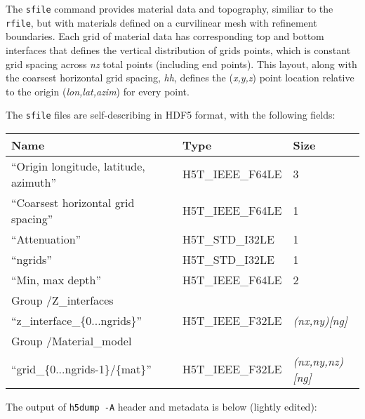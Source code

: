 \documentclass[11pt]{report}
\begin{document}
The \verb+sfile+ command provides material data and topography, 
  similiar to the \verb+rfile+, but with materials defined on
  a curvilinear mesh with refinement boundaries.
Each grid of material data has corresponding top and bottom interfaces
  that defines the vertical distribution of grids points, which is constant
  grid spacing across {\em nz} total points (including end points).
This layout, along with the coarsest horizontal grid spacing, {\em hh}, defines
  the ({\em x,y,z}) point location relative to the origin ({\em lon,lat,azim})
  for every point.

The \verb+sfile+ files are self-describing in HDF5 format, with
  the following fields:
\begin{center}
\begin{tabular}{lll}\hline
Name & Type & Size \\ \hline
  ``Origin longitude, latitude, azimuth'' & H5T\_IEEE\_F64LE & 3 \\ \hline
  ``Coarsest horizontal grid spacing'' & H5T\_IEEE\_F64LE & 1 \\ \hline
  ``Attenuation'' & H5T\_STD\_I32LE & 1 \\ \hline
  ``ngrids'' & H5T\_STD\_I32LE & 1 \\ \hline
  ``Min, max depth'' & H5T\_IEEE\_F64LE & 2 \\ \hline
Group /Z\_interfaces \\ \hline
  ``z\_interface\_\{0...ngrids\}'' & H5T\_IEEE\_F32LE & {\em (nx,ny)[ng]}  \\ \hline
Group /Material\_model \\ \hline
  ``grid\_\{0...ngrids-1\}/\{mat\}'' & H5T\_IEEE\_F32LE & {\em (nx,ny,nz)[ng]} \\ \hline
\end{tabular}
\end{center}

The output of {\tt h5dump -A} header and metadata is below (lightly edited):
\end{document}
